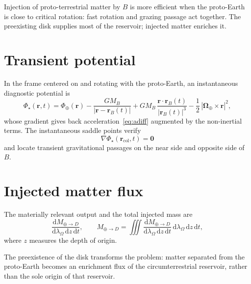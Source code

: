\documentclass[11pt,a4paper,openany]{report}
\newcommand{\dd}{\mathrm{d}}
\begin{document}
\begin{lecture}
Injection of proto-terrestrial matter by $B$ is more efficient when the proto-Earth is close to
critical rotation: fast rotation and grazing passage act together. The preexisting disk supplies
most of the reservoir; injected matter enriches it.
\end{lecture}

\section{Transient potential}

In the frame centered on and rotating with the proto-Earth, an instantaneous diagnostic potential
is
\begin{equation}
\Phi_\star(\mathbf{r},t)=\Phi_\oplus(\mathbf{r})-\frac{GM_B}{|\mathbf{r}-\mathbf{r}_B(t)|}
+GM_B\,\frac{\mathbf{r}\cdot\mathbf{r}_B(t)}{|\mathbf{r}_B(t)|^3}
-\frac12\,|\boldsymbol{\Omega}_\oplus\times\mathbf{r}|^2,
\label{eq:Phistar}
\end{equation}
whose gradient gives back acceleration~\eqref{eq:adiff} augmented by the non-inertial terms. The
instantaneous saddle points verify
\begin{equation}
\nabla\Phi_\star(\mathbf{r}_{\mathrm{col}},t)=\mathbf{0}
\label{eq:col}
\end{equation}
and locate transient gravitational passages on the near side and opposite side of $B$.

\section{Injected matter flux}

The materially relevant output and the total injected mass are
\begin{equation}
\frac{\dd M_{\oplus\to D}}{\dd\lambda_\Omega\,\dd z\,\dd t},
\qquad
M_{\oplus\to D}=\iiint\frac{\dd M_{\oplus\to D}}{\dd\lambda_\Omega\,\dd z\,\dd t}\,
\dd\lambda_\Omega\,\dd z\,\dd t,
\label{eq:flux}
\end{equation}
where $z$ measures the depth of origin.

\begin{ideephys}
The preexistence of the disk transforms the problem: matter separated from the proto-Earth becomes
an enrichment flux of the circumterrestrial reservoir, rather than the sole origin of that reservoir.
\end{ideephys}

\end{document}

